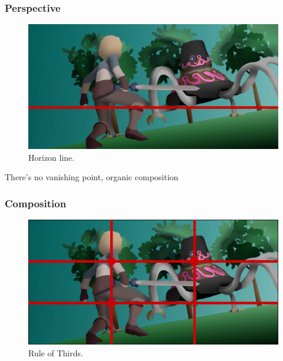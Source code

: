 \documentclass{cup-pan}
\begin{document}
        \subsubsection{Perspective}

            \begin{figure}[H]
                \includegraphics[width=\textwidth]{Imagenes/Fanart2/Analysis/horizonte.png}
                \caption{Horizon line.}
            \end{figure}

            There's no vanishing point, organic composition

        \subsubsection{Composition}

            \begin{figure}[H]
                \includegraphics[width=\textwidth]{Imagenes/Fanart2/Analysis/Analysis.png}
                \caption{Rule of Thirds.}
            \end{figure}
\end{document}

